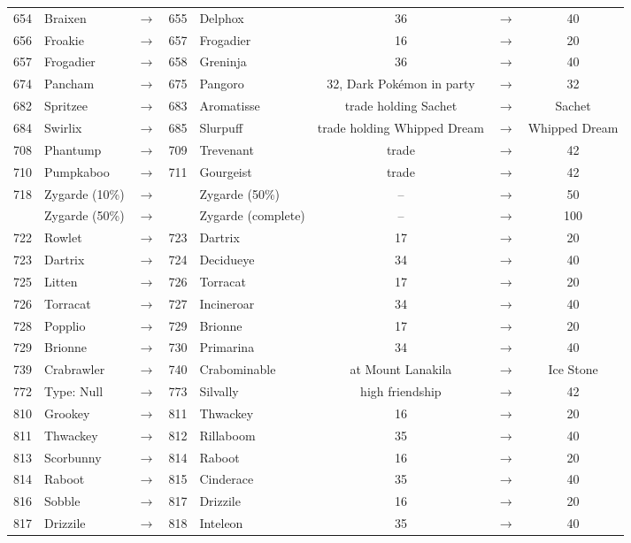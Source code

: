 \documentclass{article}
\begin{document}
\begin{longtable}{rlcrl|ccc}
654 & Braixen & $\rightarrow$ & 655 & Delphox & 36 & $\rightarrow$ & 40 \\
656 & Froakie & $\rightarrow$ & 657 & Frogadier & 16 & $\rightarrow$ & 20 \\
657 & Frogadier & $\rightarrow$ & 658 & Greninja & 36 & $\rightarrow$ & 40 \\
674 & Pancham & $\rightarrow$ & 675 & Pangoro & 32, Dark Pok\'emon in party & $\rightarrow$ & 32 \\
682 & Spritzee & $\rightarrow$ & 683 & Aromatisse & trade holding Sachet & $\rightarrow$ & Sachet \\
684 & Swirlix & $\rightarrow$ & 685 & Slurpuff & trade holding Whipped Dream & $\rightarrow$ & Whipped Dream \\
708 & Phantump & $\rightarrow$ & 709 & Trevenant & trade & $\rightarrow$ & 42 \\
710 & Pumpkaboo & $\rightarrow$ & 711 & Gourgeist & trade & $\rightarrow$ & 42 \\
718 & Zygarde (10\%) & $\rightarrow$ &  & Zygarde (50\%) & -- & $\rightarrow$ & 50 \\
    & Zygarde (50\%) & $\rightarrow$ &  & Zygarde (complete) & -- & $\rightarrow$ & 100 \\
\hline %
722 & Rowlet & $\rightarrow$ & 723 & Dartrix & 17 & $\rightarrow$ & 20 \\
723 & Dartrix & $\rightarrow$ & 724 & Decidueye & 34 & $\rightarrow$ & 40 \\
725 & Litten & $\rightarrow$ & 726 & Torracat & 17 & $\rightarrow$ & 20 \\
726 & Torracat & $\rightarrow$ & 727 & Incineroar & 34 & $\rightarrow$ & 40 \\
728 & Popplio & $\rightarrow$ & 729 & Brionne & 17 & $\rightarrow$ & 20 \\
729 & Brionne & $\rightarrow$ & 730 & Primarina & 34 & $\rightarrow$ & 40 \\
739 & Crabrawler & $\rightarrow$ & 740 & Crabominable & at Mount Lanakila & $\rightarrow$ & Ice Stone \\
772 & Type: Null & $\rightarrow$ & 773 & Silvally & high friendship & $\rightarrow$ & 42 \\
\hline %
810 & Grookey & $\rightarrow$ & 811 & Thwackey & 16 & $\rightarrow$ & 20 \\
811 & Thwackey & $\rightarrow$ & 812 & Rillaboom & 35 & $\rightarrow$ & 40 \\
813 & Scorbunny & $\rightarrow$ & 814 & Raboot & 16 & $\rightarrow$ & 20 \\
814 & Raboot & $\rightarrow$ & 815 & Cinderace & 35 & $\rightarrow$ & 40 \\
816 & Sobble & $\rightarrow$ & 817 & Drizzile & 16 & $\rightarrow$ & 20 \\
817 & Drizzile & $\rightarrow$ & 818 & Inteleon & 35 & $\rightarrow$ & 40 \\
\end{longtable}
\end{document}
